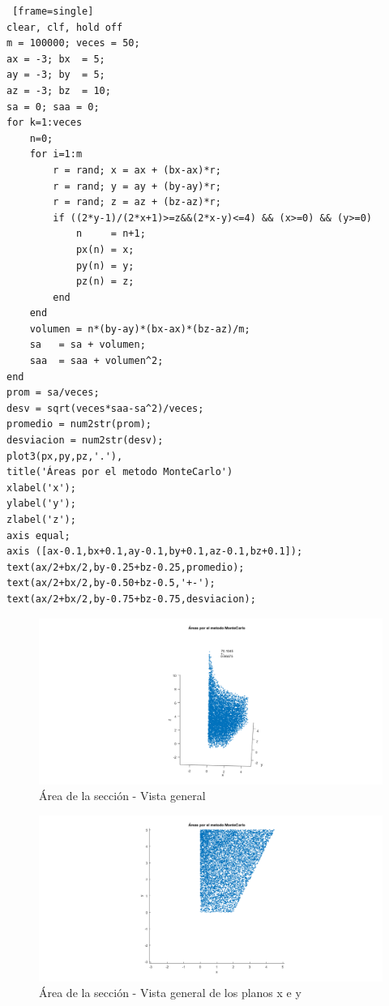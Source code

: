 \documentclass{article}
\begin{document}
\begin{lstlisting} [frame=single]
clear, clf, hold off
m = 100000; veces = 50;
ax = -3; bx  = 5;
ay = -3; by  = 5;
az = -3; bz  = 10; 
sa = 0; saa = 0;
for k=1:veces
    n=0;
    for i=1:m
        r = rand; x = ax + (bx-ax)*r;
        r = rand; y = ay + (by-ay)*r;
        r = rand; z = az + (bz-az)*r;
        if ((2*y-1)/(2*x+1)>=z&&(2*x-y)<=4) && (x>=0) && (y>=0)
            n     = n+1;
            px(n) = x; 
            py(n) = y;
            pz(n) = z;
        end
    end
    volumen = n*(by-ay)*(bx-ax)*(bz-az)/m;
    sa   = sa + volumen;
    saa  = saa + volumen^2;
end
prom = sa/veces;
desv = sqrt(veces*saa-sa^2)/veces;
promedio = num2str(prom);
desviacion = num2str(desv);
plot3(px,py,pz,'.'),
title('Áreas por el metodo MonteCarlo') 
xlabel('x');
ylabel('y');
zlabel('z');
axis equal;
axis ([ax-0.1,bx+0.1,ay-0.1,by+0.1,az-0.1,bz+0.1]);
text(ax/2+bx/2,by-0.25+bz-0.25,promedio);
text(ax/2+bx/2,by-0.50+bz-0.5,'+-');
text(ax/2+bx/2,by-0.75+bz-0.75,desviacion);
\end{lstlisting}



\begin{figure}[H]
\centering
    \includegraphics[width=1\textwidth]{images/FIG08A.png}
    \caption{Área de la sección - Vista general}
\end{figure}

\begin{figure}[H]
\centering
    \includegraphics[width=1\textwidth]{images/FIG08B.png}
    \caption{Área de la sección - Vista general de los planos x e y}
\end{figure}
\end{document}
